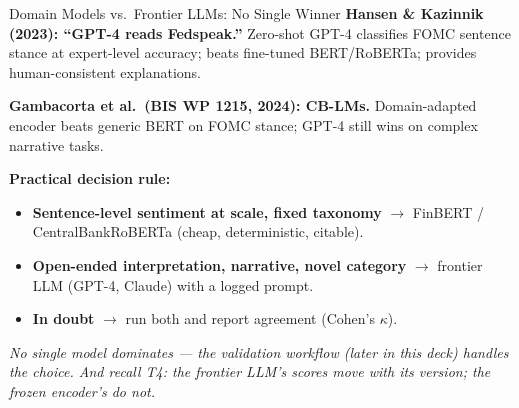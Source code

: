 \begin{frame}{Domain Models vs.\ Frontier LLMs: No Single Winner}
\textbf{Hansen \& Kazinnik (2023): ``GPT-4 reads Fedspeak.''} Zero-shot GPT-4 classifies FOMC sentence stance at expert-level accuracy; beats fine-tuned BERT/RoBERTa; provides human-consistent explanations.

\smallskip
\textbf{Gambacorta et al.\ (BIS WP 1215, 2024): CB-LMs.} Domain-adapted encoder beats generic BERT on FOMC stance; GPT-4 still wins on complex narrative tasks.

\smallskip
\textbf{Practical decision rule:}
\begin{itemize}\itemsep1pt
  \item \textbf{Sentence-level sentiment at scale, fixed taxonomy} $\to$ FinBERT / CentralBankRoBERTa (cheap, deterministic, citable).
  \item \textbf{Open-ended interpretation, narrative, novel category} $\to$ frontier LLM (GPT-4, Claude) with a logged prompt.
  \item \textbf{In doubt} $\to$ run both and report agreement (Cohen's $\kappa$).
\end{itemize}

\smallskip
\textit{No single model dominates --- the validation workflow (later in this deck) handles the choice. And recall T4: the frontier LLM's scores move with its version; the frozen encoder's do not.}
\end{frame}

